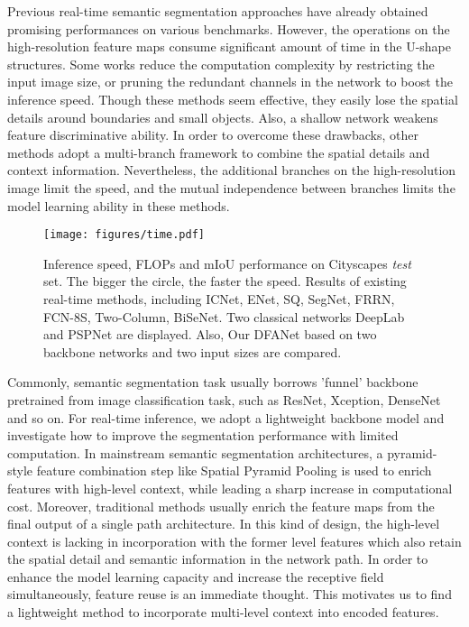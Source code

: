 \documentclass[10pt,twocolumn,letterpaper]{article}
\begin{document}
Previous real-time semantic segmentation approaches \cite{segnet}\cite{SQ}\cite{twocolumn}\cite{BiSeNet}\cite{ICNet}\cite{enet} have already obtained promising performances on various benchmarks\cite{VOC}\cite{CityScapes}\cite{COCO}\cite{ADE20K}\cite{CamVid}. 
However, the operations on the high-resolution feature maps consume significant amount of time in the U-shape structures. 
Some works reduce the computation complexity by restricting the input image size\cite{twocolumn}, or pruning the redundant channels in the network to boost the inference speed\cite{segnet}\cite{enet}. Though these methods seem effective, they easily lose the spatial details around boundaries and small objects. Also, a shallow network weakens feature discriminative ability. 
In order to overcome these drawbacks, other methods \cite{ICNet}\cite{BiSeNet} adopt a multi-branch framework to combine the spatial details and context information. Nevertheless, the additional branches on the high-resolution image limit the speed, and the mutual independence between branches limits the model learning ability in these methods.

\begin{figure}
\begin{center}
   \texttt{[image: figures/time.pdf]}
\end{center}
   \caption{Inference speed, FLOPs and mIoU performance on Cityscapes \textit{test} set. The bigger the circle, the faster the speed.    Results of existing real-time methods, including ICNet\cite{ICNet}, ENet\cite{enet}, SQ\cite{SQ}, SegNet\cite{segnet}, FRRN\cite{frrn}, FCN-8S\cite{fcn_seg}, Two-Column\cite{twocolumn}, BiSeNet\cite{BiSeNet}. Two classical networks DeepLab\cite{deeplabv3plus} and PSPNet\cite{pspnet} are displayed. Also, Our DFANet based on two backbone networks and two input sizes are compared.}
\label{fig:long}
\label{fig:onecol}
\end{figure}



Commonly, semantic segmentation task usually borrows 'funnel' backbone pretrained from image classification task, such as ResNet\cite{ResNet}, Xception\cite{Xception}, DenseNet\cite{DenseNet} and so on. 
For real-time inference, we adopt a lightweight backbone model and investigate how to improve the segmentation performance with limited computation. 
In mainstream semantic segmentation architectures, a pyramid-style feature combination step like Spatial Pyramid Pooling\cite{pspnet}\cite{deeplanv3} is used to enrich features with high-level context, while leading a sharp increase in computational cost.
Moreover, traditional methods usually enrich the feature maps from the final output of a single path architecture. In this kind of design, the high-level context is lacking in incorporation with the former level features which also retain the spatial detail and semantic information in the network path. 
In order to enhance the model learning capacity and increase the receptive field simultaneously, feature reuse is an immediate thought. This motivates us to find a lightweight method to incorporate multi-level context into encoded features.
\end{document}
